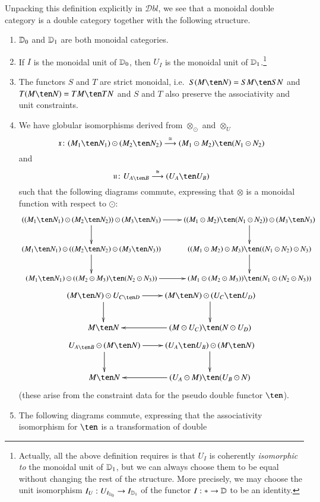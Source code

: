 \documentclass{amsart}
\begin{document}
Unpacking this definition explicitly in $\mathcal{D}bl$, we see that a monoidal
double category is a double category together with the following
structure.
\begin{enumerate}
\item $\mathbb{D}_0$ and $\mathbb{D}_1$ are both monoidal categories.
\item If $I$ is the monoidal unit of $\mathbb{D}_0$, then $U_I$ is the
  monoidal unit of $\mathbb{D}_1$.\footnote{Actually, all the above
    definition requires is that $U_I$ is coherently \emph{isomorphic
      to} the monoidal unit of $\mathbb{D}_1$, but we can always choose them
    to be equal without changing the rest of the structure.
    More precisely, we may choose the unit isomorphism
    $I_U : U_{I_{\mathbb{D}_0}} \to I_{\mathbb{D}_1}$ of the functor $I:* \to \mathbb{D}$
    to be an identity.}
\item The functors $S$ and $T$ are strict monoidal, i.e.\ $S(M\ten N)
  = SM\ten SN$ and $T(M\ten N)=TM\ten TN$ and $S$ and $T$ also
  preserve the associativity and unit constraints.
\item \label{eq:mon1} We have globular isomorphisms derived from $\otimes_{\odot}$ and $\otimes_U$
  \[\fx\maps (M_1\ten N_1)\odot (M_2\ten N_2)\too[\iso] (M_1\odot M_2)\ten (N_1\odot N_2)\]
  and
  \[\fu\maps U_{A\ten B} \too[\iso] (U_A \ten U_B)\]
  such that the following diagrams commute, expressing that $\otimes$ is a monoidal function with respect to $\odot$:
\[
  \xymatrix{
    ((M_1\ten N_1)\odot (M_2\ten N_2)) \odot (M_3\ten N_3) \ar[r]\ar[d]
    & ((M_1\odot M_2)\ten (N_1\odot N_2)) \odot (M_3\ten N_3) \ar[d]\\
    (M_1\ten N_1)\odot ((M_2\ten N_2) \odot (M_3\ten N_3)) \ar[d] &
    ((M_1\odot M_2)\odot M_3) \ten ((N_1\odot N_2)\odot N_3) \ar[d]\\
    (M_1\ten N_1) \odot ((M_2\odot M_3) \ten (N_2\odot N_3))\ar[r] &
    (M_1\odot (M_2\odot M_3)) \ten (N_1\odot (N_2\odot N_3))}\]
  \[\xymatrix{(M\ten N) \odot U_{C\ten D} \ar[r]\ar[d] &
    (M\ten N)\odot (U_C\ten U_D) \ar[d]\\
    M\ten N\ar@{<-}[r] & (M\odot U_C) \ten (N\odot U_D)}\]
  \[\xymatrix{U_{A\ten B}\odot (M\ten N)  \ar[r]\ar[d] &
    (U_A\ten U_B)\odot (M\ten N) \ar[d]\\
    M\ten N\ar@{<-}[r] & (U_A \odot M) \ten (U_B\odot N)}\]
  (these arise from the constraint data for the pseudo double functor
  $\ten$).
\item \label{eq:mon2}The following diagrams commute, expressing that the
  associativity isomorphism for $\ten$ is a transformation of double

\end{enumerate}
\end{document}
